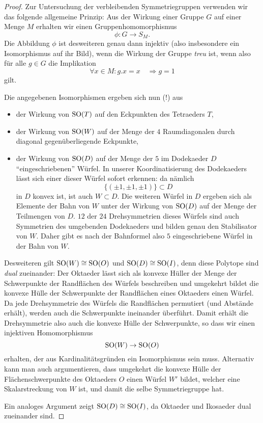 \documentclass{book}
\begin{document}
\begin{proof}
    Zur Untersuchung der verbleibenden Symmetriegruppen verwenden wir das
    folgende allgemeine Prinzip: Aus der Wirkung einer Gruppe $G$ auf einer
    Menge $M$ erhalten wir einen Gruppenhomomorphismus
    \[
        \phi: G \to S_M.
    \]
    Die Abbildung $\phi$ ist desweiteren genau dann injektiv (also insbesondere ein
    Isomorphismus auf ihr Bild), wenn die Wirkung der Gruppe {\em
    treu} ist, wenn also für alle $g \in G$ die Implikation
    \[
        \forall x \in M : g.x = x \quad \Rightarrow g = 1
    \]
    gilt.

    Die angegebenen Isomorphismen ergeben sich nun (!) aus 
    \begin{itemize}
        \item der Wirkung von $\operatorname{SO}(T)$ auf den Eckpunkten des Tetraeders $T$,
        \item der Wirkung von $\operatorname{SO}(W)$ auf der Menge der $4$ Raumdiagonalen durch diagonal gegenüberliegende Eckpunkte,
        \item der Wirkung von $\operatorname{SO}(D)$ auf der Menge der $5$ im Dodekaeder $D$
            ``eingeschriebenen'' Würfel. In unserer Koordinatisierung des
            Dodekaeders lässt sich einer dieser Würfel sofort erkennen: da nämlich 
            \[
                \{(\pm 1, \pm 1, \pm 1) \} \subset D
            \]
            in $D$ konvex ist, ist auch $W \subset D$. Die weiteren Würfel in $D$ ergeben
            sich als Elemente der Bahn von $W$ unter der Wirkung von
            $\operatorname{SO}(D)$ auf der Menge der Teilmengen von $D$. $12$ der $24$
            Drehsymmetrien dieses Würfels sind auch Symmetrien des umgebenden
            Dodekaeders und bilden genau den Stabilisator von $W$. Daher gibt
            es nach der Bahnformel also $5$ eingeschriebene Würfel in der Bahn von
            $W$.
    \end{itemize}

    Desweiteren gilt $\operatorname{SO}(W) \cong \operatorname{SO}(O)$ und $\operatorname{SO}(D) \cong \operatorname{SO}(I)$, denn
    diese Polytope sind {\em dual} zueinander: Der Oktaeder lässt sich als
    konvexe Hüller der Menge der Schwerpunkte der Randflächen des Würfels
    beschreiben und umgekehrt bildet die konvexe Hülle der Schwerpunkte der
    Randflächen eines Oktaeders einen Würfel. Da jede Drehsymmetrie des Würfels
    die Randflächen permutiert (und Abstände erhält), werden auch die
    Schwerpunkte ineinander überführt. Damit erhält die Drehsymmetrie also
    auch die konvexe Hülle der Schwerpunkte, so dass wir einen injektiven Homomorphismus
    \[
        \operatorname{SO}(W) \to \operatorname{SO}(O)
    \]
    erhalten, der aus Kardinalitätsgründen ein Isomorphismus sein muss.
    Alternativ kann man auch argumentieren, dass umgekehrt die konvexe Hülle
    der Flächenschwerpunkte des Oktaeders $O$ einen Würfel $W'$ bildet, welcher
    eine Skalarstreckung von $W$ ist, und damit die selbe Symmetriegruppe hat. 

    Ein analoges Argument zeigt $\operatorname{SO}(D) \cong \operatorname{SO}(I)$, da Oktaeder und
    Ikosaeder dual zueinander sind.
\end{proof}
\end{document}
